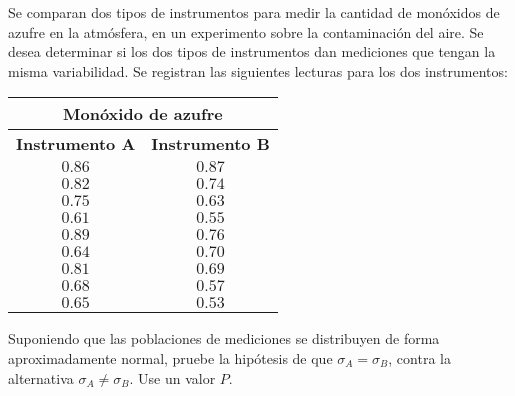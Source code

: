 \begin{enunciado}
 Se comparan dos tipos de instrumentos para medir la cantidad de mon\'oxidos
 de azufre en la atm\'osfera, en un experimento sobre la contaminaci\'on del aire.
 Se desea determinar si los dos tipos de instrumentos dan mediciones que tengan la misma variabilidad.
 Se registran las siguientes lecturas para los dos instrumentos:
 \begin{center}
  \begin{tabular}{cc}
   \multicolumn{2}{c}{\textbf{Mon\'oxido de azufre}} \\
   \hline 
   \textbf{Instrumento A} & \textbf{Instrumento B} \\ 
   \hline 
   $0.86$ & $0.87$ \\
   $0.82$ & $0.74$ \\
   $0.75$ & $0.63$ \\
   $0.61$ & $0.55$ \\
   $0.89$ & $0.76$ \\
   $0.64$ & $0.70$ \\
   $0.81$ & $0.69$ \\
   $0.68$ & $0.57$ \\
   $0.65$ & $0.53$
  \end{tabular}
 \end{center}
 Suponiendo que las poblaciones de mediciones se distribuyen
 de forma aproximadamente normal,
 pruebe la hip\'otesis de que $\sigma_A = \sigma_B$, contra la alternativa
 $\sigma_A \neq \sigma_B$. Use un valor $P$.
\end{enunciado}

